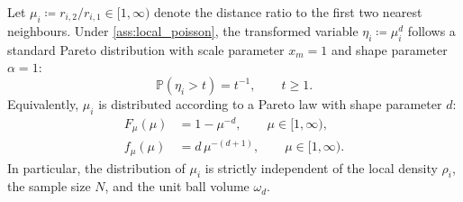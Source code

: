 \begin{theorem}
  \label{thm:pareto_ratio}
  Let $\mu_i \coloneqq r_{i,2} / r_{i,1} \in [1, \infty)$ denote the
  distance ratio to the first two nearest neighbours. Under
  \cref{ass:local_poisson}, the transformed variable
  $\eta_i \coloneqq \mu_i^d$ follows a standard Pareto distribution
  with scale parameter $x_m = 1$ and shape parameter $\alpha = 1$:
  \begin{equation}
    \mathbb{P}(\eta_i > t) = t^{-1}, \qquad t \ge 1.
    \label{eq:pareto_eta}
  \end{equation}
  Equivalently, $\mu_i$ is distributed according to a Pareto law
  with shape parameter $d$:
  \begin{align}
    F_\mu(\mu) &= 1 - \mu^{-d}, \qquad \mu \in [1, \infty),
    \label{eq:pareto_cdf} \\
    f_\mu(\mu) &= d \, \mu^{-(d+1)}, \qquad \mu \in [1, \infty).
    \label{eq:pareto_pdf}
  \end{align}
  In particular, the distribution of $\mu_i$ is strictly independent
  of the local density $\rho_i$, the sample size $N$, and the unit
  ball volume $\omega_d$.
\end{theorem}

